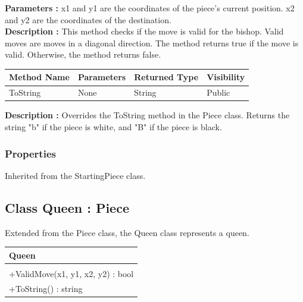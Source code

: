 \documentclass[12pt]{article}
\begin{document}
    \textbf{Parameters :} x1 and y1 are the coordinates of the piece's current position.
    x2 and y2 are the coordinates of the destination.  
\\
    \textbf{Description :} This method checks if the move is valid for the bishop. 
    Valid moves are moves in a diagonal direction.
    The method returns true if the move is valid.
    Otherwise, the method returns false.
    
\begin{table}[H]
    \begin{tabular}{|l|l|l|l|}
    \hline
    \rowcolor[HTML]{EFEFEF} 
    \cellcolor[HTML]{EFEFEF}\textbf{Method Name} & \textbf{Parameters}  & \textbf{Returned Type} & \textbf{Visibility} \\ \hline
    ToString                                   & None                 & String                   & Public              \\ \hline
    \end{tabular}
\end{table}

    \textbf{Description :} Overrides the ToString method in the Piece class.
    Returns the string "b" if the piece is white, and "B" if the piece is black. 

\subsubsection{Properties}

    Inherited from the StartingPiece class.

\newpage


\subsection{Class Queen : Piece}

    Extended from the Piece class, the Queen class represents a queen.
\begin{table}[H]
    \begin{tabular}{|l|}
    \hline
    \cellcolor[HTML]{C0C0C0}\textbf{Queen} \\ \hline
    \cellcolor[HTML]{EFEFEF}                    \\ \hline
    +ValidMove(x1, y1, x2, y2) : bool           \\ \hline
    +ToString() : string                        \\ \hline
    \end{tabular}
\end{table}
\end{document}
